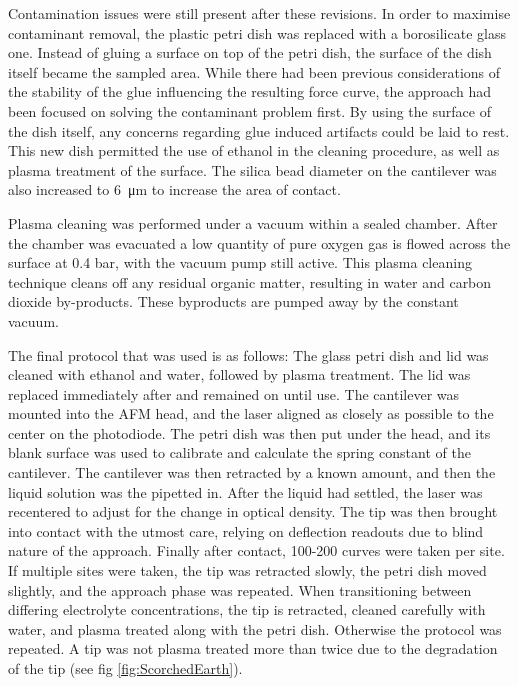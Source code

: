 Contamination issues were still present after these revisions. In order to maximise contaminant removal, the plastic petri dish was replaced with a borosilicate glass one. Instead of gluing a surface on top of the petri dish, the surface of the dish itself became the sampled area. While there had been previous considerations of the stability of the glue influencing the resulting force curve, the approach had been focused on solving the contaminant problem first. By using the surface of the dish itself, any concerns regarding glue induced artifacts could be laid to rest. This new dish permitted the use of ethanol in the cleaning procedure, as well as plasma treatment of the surface. The silica bead diameter on the cantilever was also increased to \SI{6}{\micro\metre} to increase the area of contact. 


Plasma cleaning was performed under a vacuum within a sealed chamber. After the chamber was evacuated a low quantity of pure oxygen gas is flowed across the surface at 0.4 bar, with the vacuum pump still active. This plasma cleaning technique cleans off any residual organic matter, resulting in water and carbon dioxide by-products. These byproducts are pumped away by the constant vacuum. \cite{PlasUV} \cite{PlasTreat} \cite{SilicaAFMCleaning}



The final protocol that was used is as follows: The glass petri dish and lid was cleaned with ethanol and water, followed by plasma treatment. The lid was replaced immediately after and remained on until use. The cantilever was mounted into the AFM head, and the laser aligned as closely as possible to the center on the photodiode. The petri dish was then put under the head, and its blank surface was used to calibrate and calculate the spring constant of the cantilever. The cantilever was then retracted by a known amount, and then the liquid solution was the pipetted in. After the liquid had settled, the laser was recentered to adjust for the change in optical density. The tip was then brought into contact with the utmost care, relying on deflection readouts due to blind nature of the approach. Finally after contact, 100-200 curves were taken per site. If multiple sites were taken, the tip was retracted slowly, the petri dish moved slightly, and the approach phase was repeated. When transitioning between differing electrolyte concentrations, the tip is retracted, cleaned carefully with water, and plasma treated along with the petri dish. Otherwise the protocol was repeated. A tip was not plasma treated more than twice due to the degradation of the tip (see fig \ref{fig:ScorchedEarth}).

